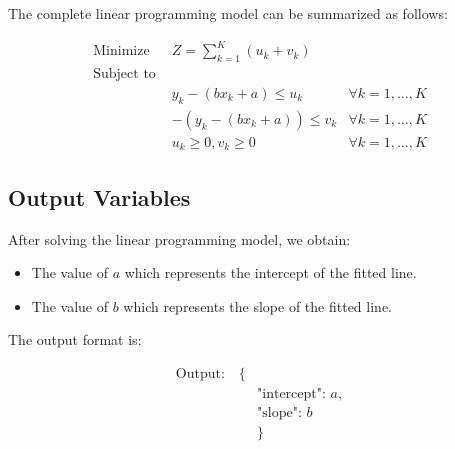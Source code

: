 \documentclass{article}
\begin{document}
The complete linear programming model can be summarized as follows:

\begin{align*}
\text{Minimize } & Z = \sum_{k=1}^{K} (u_k + v_k) \\
\text{Subject to } & \\
& y_k - (bx_k + a) \leq u_k & \forall k = 1, \ldots, K \\
& -(y_k - (bx_k + a)) \leq v_k & \forall k = 1, \ldots, K \\
& u_k \geq 0, v_k \geq 0 & \forall k = 1, \ldots, K
\end{align*}

\subsection*{Output Variables}

After solving the linear programming model, we obtain:

\begin{itemize}
    \item The value of \( a \) which represents the intercept of the fitted line.
    \item The value of \( b \) which represents the slope of the fitted line.
\end{itemize}

The output format is:

\[
\begin{align*}
\text{Output:} \quad \{ & \\
& \text{"intercept": } a, \\
& \text{"slope": } b \\
& \}
\end{align*}
\]
\end{document}
